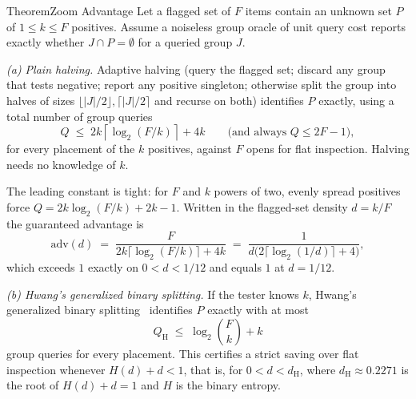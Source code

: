 \documentclass[11pt,a4paper]{article}
\theoremstyle{definition}
\theoremstyle{plain}
\begin{document}
\begin{pdclaim}{Theorem}{Zoom Advantage}
\setlength{\parskip}{4pt plus 1pt}
\label{thm:zoom-advantage}
Let a flagged set of $F$ items contain an unknown set $P$ of $1\le k\le F$
positives. Assume a noiseless group oracle of unit query cost reports exactly
whether $J\cap P=\emptyset$ for a queried group $J$.

\emph{(a) Plain halving.} Adaptive halving (query
the flagged set; discard any group that tests negative; report any positive
singleton; otherwise split the group into halves of sizes
$\lfloor|J|/2\rfloor,\lceil|J|/2\rceil$ and recurse on both) identifies $P$
exactly, using a total number of group queries
\[
Q \;\le\; 2k\left\lceil\log_2(F/k)\right\rceil + 4k
\qquad\text{(and always } Q\le 2F-1\text{)},
\]
for every placement of the $k$ positives, against $F$ opens for flat inspection.
Halving needs no knowledge of $k$.

The leading constant is tight: for $F$ and $k$ powers of two, evenly spread
positives force $Q=2k\log_2(F/k)+2k-1$. Written in the flagged-set density $d=k/F$
the guaranteed advantage is
\[
\mathrm{adv}(d)\;=\;\frac{F}{2k\lceil\log_2(F/k)\rceil+4k}
\;=\;\frac{1}{d\bigl(2\lceil\log_2(1/d)\rceil+4\bigr)},
\]
which exceeds $1$ exactly on $0<d<1/12$ and equals $1$ at $d=1/12$.

\emph{(b) Hwang's generalized binary splitting.} If the tester knows $k$,
Hwang's generalized binary splitting~ identifies $P$ exactly with
at most
\[
Q_{\mathrm{H}}\;\le\;\log_2\binom Fk+k
\]
group queries for every placement. This certifies a strict saving over flat
inspection whenever $H(d)+d<1$, that is, for $0<d<d_{\mathrm{H}}$, where
$d_{\mathrm{H}}\approx0.2271$ is the root of $H(d)+d=1$ and $H$ is the binary
entropy.
\end{pdclaim}
\end{document}
